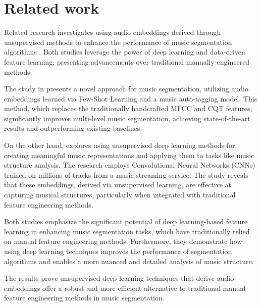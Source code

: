 \section{Related work}

Related research investigates using audio embeddings derived through unsupervised methods to enhance the performance of music segmentation algorithms \cite{deepfeaturesegment, SalamonDeepSegmentation}. Both studies leverage the power of deep learning and data-driven feature learning, presenting advancements over traditional manually-engineered methods.

The study in \cite{deepfeaturesegment} presents a novel approach for music segmentation, utilizing audio embeddings learned via Few-Shot Learning and a music auto-tagging model. This method, which replaces the traditionally handcrafted MFCC and CQT features, significantly improves multi-level music segmentation, achieving state-of-the-art results and outperforming existing baselines.

On the other hand, \cite{SalamonDeepSegmentation} explores using unsupervised deep learning methods for creating meaningful music representations and applying them to tasks like music structure analysis. The research employs Convolutional Neural Networks (CNNs) trained on millions of tracks from a music streaming service. The study reveals that these embeddings, derived via unsupervised learning, are effective at capturing musical structures, particularly when integrated with traditional feature engineering methods.

Both studies emphasize the significant potential of deep learning-based feature learning in enhancing music segmentation tasks, which have traditionally relied on manual feature engineering methods. Furthermore, they demonstrate how using deep learning techniques improves the performance of segmentation algorithms and enables a more nuanced and detailed analysis of music structure. 

The results prove unsupervised deep learning techniques that derive audio embeddings offer a robust and more efficient alternative to traditional manual feature engineering methods in music segmentation.

